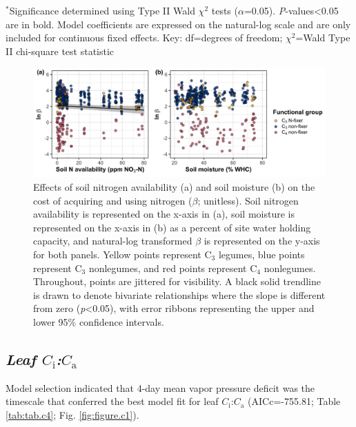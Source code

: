 \begin{singlespace}
    \noindent $^*$Significance determined using Type II Wald $\chi^{2}$ tests ($\alpha$=0.05). \textit{P}-values<0.05 are in bold. Model coefficients are expressed on the natural-log scale and are only included for continuous fixed effects. Key: df=degrees of freedom; $\chi^2$=Wald Type II chi-square test statistic
\end{singlespace}
\clearpage

\newpage
\begin{landscape}
    \begin{figure}
    \centering
    \includegraphics[scale = 0.075]{ch4_TXeco/figs/TXeco_fig2_beta.png}
    \caption[Effects of soil nitrogen availability and soil moisture on the cost of acquiring and using nitrogen]{Effects of soil nitrogen availability (a) and soil moisture (b) on the cost of acquiring and using nitrogen ($\beta$; unitless). Soil nitrogen availability is represented on the x-axis in (a), soil moisture is represented on the x-axis in (b) as a percent of site water holding capacity, and natural-log transformed $\beta$ is represented on the y-axis for both panels. Yellow points represent C$_3$ legumes, blue points represent C$_3$ nonlegumes, and red points represent C$_4$ nonlegumes. Throughout, points are jittered for visibility. A black solid trendline is drawn to denote bivariate relationships where the slope is different from zero (\textit{p}<0.05), with error ribbons representing the upper and lower 95\% confidence intervals.}
    \label{fig:figure4.2}
\end{figure}
\end{landscape}
\clearpage

\subsection{\textit{Leaf $C_\mathrm{i}$:$C_\mathrm{a}$}}
\noindent Model selection indicated that 4-day mean vapor pressure deficit was the timescale that conferred the best model fit for leaf $C_\mathrm{i}$:$C_\mathrm{a}$ (AICc=-755.81; Table \ref{tab:tab.c4}; Fig. \ref{fig:figure.c1}).

